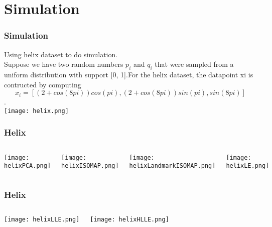 \documentclass{beamer}
\begin{document}
\section{Simulation}

\begin{frame}
\frametitle{Simulation}
Using helix dataset to do simulation.\\
Suppose we have two random numbers $p_i$ and $q_i$ that were sampled from a uniform distribution with support
[0, 1].For the helix dataset, the datapoint xi is contructed by computing \[x_i =[(2 + cos(8pi)) cos(pi), (2 + cos(8pi)) sin(pi), sin(8pi)]\].\\
\texttt{[image: helix.png]}
\end{frame}

\begin{frame}
\frametitle{Helix}
 \begin{columns}
\begin{minipage}[c][0.4\textheight][c]{\linewidth}
  \centering
  \texttt{[image: helixPCA.png]}
\end{minipage}
\begin{minipage}[c][0.4\textheight][c]{\linewidth}
  \centering
  \texttt{[image: helixISOMAP.png]}
\end{minipage}
\begin{minipage}[c][0.4\textheight][c]{\linewidth}
 
\texttt{[image: helixLandmarkISOMAP.png]}
 
\end{minipage}
\begin{minipage}[c][0.4\textheight][c]{\linewidth}
  \centering
  \texttt{[image: helixLE.png]}
\end{minipage}
\end{columns}
\end{frame}

\begin{frame}
\frametitle{Helix}
 \begin{columns}
\begin{minipage}[c][0.4\textheight][c]{\linewidth}
  \centering
  \texttt{[image: helixLLE.png]}
\end{minipage}

\begin{minipage}[c][0.4\textheight][c]{\linewidth}
  \centering
  \texttt{[image: helixHLLE.png]}
\end{minipage}
\end{columns}
\end{frame}
\end{document}

